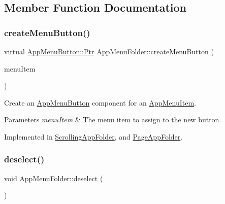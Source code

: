 \subsection{Member Function Documentation}
\mbox{\label{classAppMenuFolder_a001ecdee13bf394746b5d0b49dcc55cc}} 
\subsubsection{\texorpdfstring{create\+Menu\+Button()}{createMenuButton()}}
{\footnotesize\ttfamily virtual \mbox{\hyperlink{classAppMenuButton_aeb692efb6a933970de8eac14e5e71544}{App\+Menu\+Button\+::\+Ptr}} App\+Menu\+Folder\+::create\+Menu\+Button (\begin{DoxyParamCaption}\item[{\mbox{\hyperlink{classAppMenuItem_ab5f51c5d74f8df62b8862c0cc8126cb7}{App\+Menu\+Item\+::\+Ptr}}}]{menu\+Item }\end{DoxyParamCaption})\hspace{0.3cm}{\ttfamily [pure virtual]}}

Create an \mbox{\hyperlink{classAppMenuButton}{App\+Menu\+Button}} component for an \mbox{\hyperlink{classAppMenuItem}{App\+Menu\+Item}}.


\begin{DoxyParams}{Parameters}
{\em menu\+Item} & The menu item to assign to the new button. \\
\hline
\end{DoxyParams}


Implemented in \mbox{\hyperlink{classScrollingAppFolder_a5e27c332bbccd63bef240ec1a542e83e}{Scrolling\+App\+Folder}}, and \mbox{\hyperlink{classPageAppFolder_a1f26a965194bf0e14503823971f21ec4}{Page\+App\+Folder}}.

\mbox{\label{classAppMenuFolder_aa57adc20320fbce0bdfcbe9489394db4}} 
\subsubsection{\texorpdfstring{deselect()}{deselect()}}
{\footnotesize\ttfamily void App\+Menu\+Folder\+::deselect (\begin{DoxyParamCaption}{ }\end{DoxyParamCaption})}

